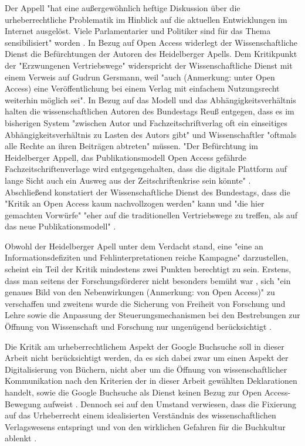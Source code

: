 Der Appell "hat eine außergewöhnlich heftige Diskussion über die urheberrechtliche Problematik im Hinblick auf die aktuellen Entwicklungen im Internet ausgelöst. Viele Parlamentarier und Politiker sind für das Thema sensibilisiert" worden \cite{WD_bundestag_2009}. In Bezug auf Open Access widerlegt der Wissenschaftliche Dienst die Befürchtungen der Autoren des Heidelberger Apells. Dem Kritikpunkt der "Erzwungenen Vertriebswege" widerspricht der Wissenschaftliche Dienst mit einem Verweis auf Gudrun Gersmann, weil "auch (Anmerkung: unter Open Access) eine Veröffentlichung bei einem Verlag mit einfachem Nutzungsrecht weiterhin möglich sei". In Bezug auf das Modell und das Abhängigkeitsverhältnis halten die wissenschaftlichen Autoren des Bundestags Reuß entgegen, dass es im bisherigen System "zwischen Autor und Fachzeitschriftverlag oft ein einseitiges Abhängigkeitsverhältnis zu Lasten des Autors gibt" und Wissenschaftler "oftmals alle Rechte an ihren Beiträgen abtreten" \cite{WD_bundestag_2009} müssen. "Der Befürchtung im Heidelberger Appell, das Publikationsmodell Open Access gefährde Fachzeitschriftenverlage wird entgegengehalten, dass die digitale Plattform auf lange Sicht auch ein Ausweg aus der Zeitschriftenkrise sein könnte" \cite{WD_bundestag_2009}. Abschließend konstatiert der Wissenschaftliche Dienst des Bundestags, dass die "Kritik an Open Access kaum nachvollzogen werden" kann und "die hier gemachten Vorwürfe" "eher auf die traditionellen Vertriebswege zu treffen, als auf das neue Publikationsmodell" \cite{WD_bundestag_2009}.

Obwohl der Heidelberger Apell unter dem Verdacht stand, eine "eine an Informationsdefiziten und Fehlinterpretationen reiche Kampagne" \cite{Schmidt_2009} darzustellen, scheint ein Teil der Kritik  mindestens zwei Punkten berechtigt zu sein. Erstens, dass man seitens der Forschungsförderer nicht besonders bemüht war \cite{suchen}, sich "ein genaues Bild von den Nebenwirkungen (Anmerkung: von Open Access)" \cite{Reuss_2009} zu verschaffen und zweitens wurde die Sicherung von Freiheit von Forschung und Lehre sowie die Anpassung der Steuerungsmechanismen bei den Bestrebungen zur Öffnung von Wissenschaft und Forschung nur ungenügend berücksichtigt \cite{hagner_2015_sache_buches}.

Die Kritik am urheberrechtlichem Aspekt der Google Buchsuche soll in dieser Arbeit nicht berücksichtigt werden, da es sich dabei zwar um einen Aspekt der Digitalisierung von Büchern, nicht aber um die Öffnung von wissenschaftlicher Kommunikation nach den Kriterien der in dieser Arbeit gewählten Deklarationen handelt, sowie die Google Buchsuche als Dienst keinen Bezug zur Open Access-Bewegung aufweist \cite{hagner_2015_sache_buches}. Dennoch sei auf den Umstand verwiesen, dass die Fixierung auf das Urheberrecht einem idealisierten Verständnis des wissenschaftlichen Verlagswesens entspringt und von den wirklichen Gefahren für die Buchkultur ablenkt \cite{Hirschi_2015_buch_oa}.

